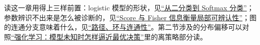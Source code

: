读这一章用得上三样前置：logistic 模型的形状，见\hyperref[sec:13-Machine-Learning/02-Linear-Models/03]{``从二分类到 Softmax 分类''}；参数辨识不出来是怎么被诊断的，见\hyperref[sec:11-Mathematical-Statistics/03-Sufficient-Statistics-and-Information/02]{``Score 与 Fisher 信息衡量局部可辨认性''}；图的连通分支意味着什么，见\hyperref[sec:04-Discrete-Mathematics/03-Graph-Theory/02]{``路径、环与连通性''}。第二节涉及的分布偏移可以对照\hyperref[ch:139]{``强化学习：模型未知时怎样逼近最优决策''}里的离策略部分读。
